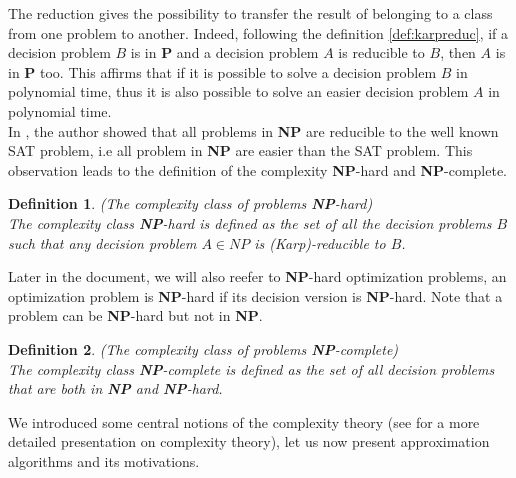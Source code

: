 \documentclass[a4paper]{book}
\newtheorem{definition}{Definition}
\begin{document}
The reduction gives the possibility to transfer the result of belonging to a class from one problem to another. Indeed, following the definition \ref{def:karpreduc}, if a decision problem $B$ is in \textbf{P} and a decision problem $A$ is reducible to $B$, then $A$ is in \textbf{P} too. This affirms that if it is possible to solve a decision problem $B$ in polynomial time, thus it is also possible to solve an easier decision problem $A$ in polynomial time. \\
In \cite{Cook71}, the author showed that all problems in \textbf{NP} are reducible to the well known {\sc SAT} problem, i.e all problem in \textbf{NP} are easier than the {\sc SAT} problem. This observation leads to the definition of the complexity \textbf{NP}-hard and \textbf{NP}-complete.

\begin{definition}{\emph{(The complexity class of problems \textbf{NP}-hard)}}\\
The complexity class \textbf{NP}-hard is defined as the set of all the decision problems $B$ such that any decision problem $A \in NP$ is (Karp)-reducible to $B$.

\end{definition}

Later in the document, we will also reefer to \textbf{NP}-hard optimization problems, an optimization problem is \textbf{NP}-hard if its decision version is \textbf{NP}-hard.  
Note that a problem can be \textbf{NP}-hard but not in \textbf{NP}.

\begin{definition}{ \emph{(The complexity class of problems \textbf{NP}-complete)}}\\
The complexity class \emph{\textbf{NP}-complete} is defined as the set of all decision problems that are both in \emph{\textbf{NP}} and \emph{\textbf{NP}-hard}.
\end{definition}

We introduced some central notions of the complexity theory (see \cite{gj} for a more detailed presentation on complexity theory), let us now present approximation algorithms and its motivations.
\end{document}
